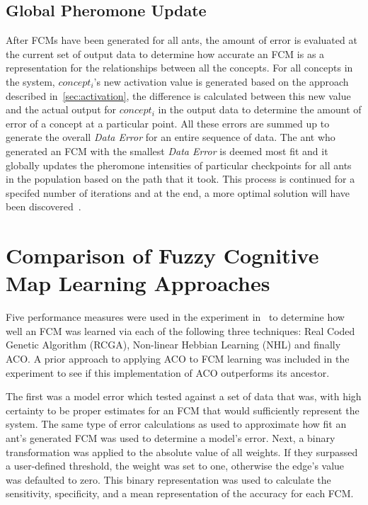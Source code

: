 \documentclass{umm-senior-sem}
\begin{document}
\subsection{Global Pheromone Update}
\label{sec:global}
After FCMs have been generated for all ants, the amount of error is evaluated at the current set of output data to determine how accurate an FCM is as a representation for the relationships between all the concepts. For all concepts in the system, $concept_i$'s new activation value is generated based on the approach described in~\ref{sec:activation}, the difference is calculated between this new value and the actual output for $concept_i$ in the output data to determine the amount of error of a concept at a particular point. All these errors are summed up to generate the overall \textit{Data Error} for an entire sequence of data. The ant who generated an FCM with the smallest \textit{Data Error} is deemed most fit and it globally updates the pheromone intensities of particular checkpoints for all ants in the population based on the path that it took. This process is continued for a specifed number of iterations and at the end, a more optimal solution will have been discovered~\cite{main:2012}.

\section{Comparison of Fuzzy Cognitive Map Learning Approaches}
\label{sec:comparison}
Five performance measures were used in the experiment in~\cite{main:2012} to determine how well an FCM was learned via each of the following three techniques: Real Coded Genetic Algorithm (RCGA), Non-linear Hebbian Learning (NHL) and finally ACO. A prior approach to applying ACO to FCM learning was included in the experiment to see if this implementation of ACO outperforms its ancestor.

The first was a model error which tested against a set of data that was, with high certainty to be proper estimates for an FCM that would sufficiently represent the system. The same type of error calculations as used to approximate how fit an ant's generated FCM was used to determine a model's error. Next, a binary transformation was applied to the absolute value of all weights. If they surpassed a user-defined threshold, the weight was set to one, otherwise the edge's value was defaulted to zero. This binary representation was used to calculate the sensitivity, specificity, and a mean representation of the accuracy for each FCM. 
\end{document}
